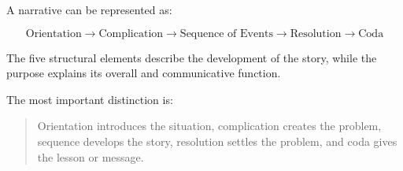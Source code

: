 A narrative can be represented as:

\[
  \text{Orientation}
  \rightarrow
  \text{Complication}
  \rightarrow
  \text{Sequence of Events}
  \rightarrow
  \text{Resolution}
  \rightarrow
  \text{Coda}
\]

The five structural elements describe the development of the story, while the purpose explains its overall and communicative function.


The most important distinction is:


\begin{quotation}
  Orientation introduces the situation, complication creates the problem, sequence develops the story, resolution settles the problem, and coda gives the lesson or message.
\end{quotation}
